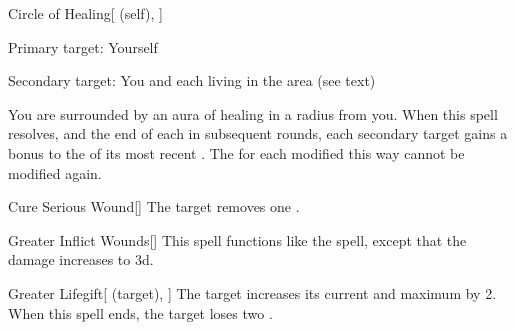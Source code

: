 \lowercase{\hypertarget{spell:Circle of Healing}{}}\label{spell:Circle of Healing}
\begin{attuneability}[Rank 5]{\hypertarget{spell:Circle of Healing}{Circle of Healing}}[ (self), ]

Primary target: Yourself
\par\noindent
Secondary target: You and each living  in the area (see text)

You are surrounded by an aura of healing in a \areamed radius  from you.
When this spell resolves, and the end of each  in subsequent rounds, each secondary target gains a  bonus to the  of its most recent .
The  for each  modified this way cannot be modified again.
\end{attuneability}
\vspace{0.25em}



\lowercase{\hypertarget{spell:Cure Serious Wound}{}}\label{spell:Cure Serious Wound}
\begin{apability}[Rank 5]{\hypertarget{spell:Cure Serious Wound}{Cure Serious Wound}}[]
The target removes one .
\end{apability}
\vspace{0.25em}



\lowercase{\hypertarget{spell:Greater Inflict Wounds}{}}\label{spell:Greater Inflict Wounds}
\begin{freeability}[Rank 5]{\hypertarget{spell:Greater Inflict Wounds}{Greater Inflict Wounds}}[]
This spell functions like the  spell, except that the damage increases to  \plus3d.
\end{freeability}
\vspace{0.25em}



\lowercase{\hypertarget{spell:Greater Lifegift}{}}\label{spell:Greater Lifegift}
\begin{attuneability}[Rank 5]{\hypertarget{spell:Greater Lifegift}{Greater Lifegift}}[ (target), ]
The target increases its current and maximum  by 2.
When this spell ends, the target loses two .
\end{attuneability}
\vspace{0.25em}



